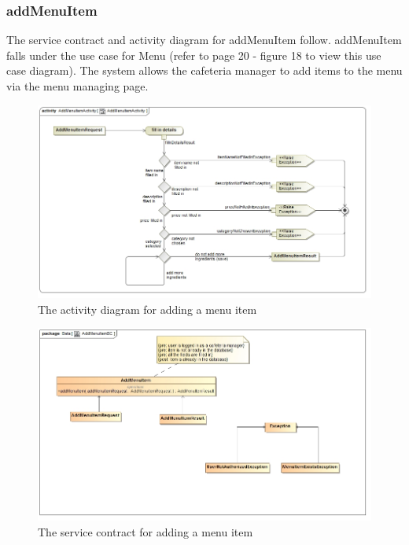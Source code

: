 \documentclass[a4paper,12pt]{report}
\begin{document}
 \subsubsection{addMenuItem}
The service contract and activity diagram for addMenuItem follow. addMenuItem falls under the use case for Menu (refer to page  20 - figure 18 to view this use case diagram). The system allows the cafeteria manager to add items to the menu via the menu managing page.
\begin{figure}[H]
  \centering
    \includegraphics[width=1.0\textwidth]{../images/AddMenuItemActivity.jpg}
    \caption{The activity diagram for adding a menu item } 
\end{figure}
\begin{figure}[H]
	\centering
	\includegraphics[width=1.0\textwidth]{../images/AddMenuItemSC.jpg}
	\caption{The service contract for adding a menu item}
\end{figure}
\end{document}
